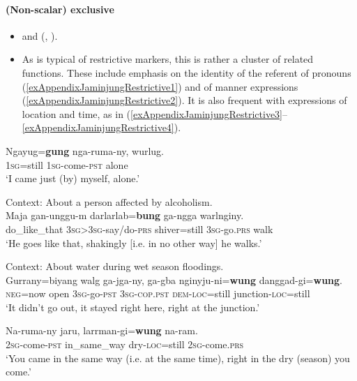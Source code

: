 \paragraph{(Non-scalar) exclusive}
\begin{itemize}
	\item \textcite[76–78]{Cleverly1968} and \citeauthor{SchultzeBerndt2000} (\citeyear[104]{SchultzeBerndt2000}, \citeyear{SchultzeBerndt2002}).
	\item As is typical of restrictive markers, this is rather a cluster of related functions. These include emphasis on the identity of the referent of pronouns (\ref{exAppendixJaminjungRestrictive1}) and of manner expressions (\ref{exAppendixJaminjungRestrictive2}). It is also frequent with expressions of location and time, as in (\ref{exAppendixJaminjungRestrictive3}–\ref{exAppendixJaminjungRestrictive4}).
\end{itemize}
\largerpage[2]
\begin{exe}
	\ex\label{exAppendixJaminjungRestrictive1}
	\gll Ngayug=\textbf{gung} nga-ruma-ny, wurlug.\\
	1\textsc{sg}=still 1\textsc{sg}-come-\textsc{pst} alone\\
	\glt \lq I came just (by) myself, alone.' \parencite[236]{SchultzeBerndt2002}
	
	\ex\label{exAppendixJaminjungRestrictive2}
	Context: About a person affected by alcoholism.\\
	\gll Maja gan-unggu-m darlarlab=\textbf{bung} ga-ngga warlnginy.\\
	do\_like\_that 3\textsc{sg}>3\textsc{sg}-say/do-\textsc{prs} shiver=still 3\textsc{sg}-go.\textsc{prs} walk\\
	\glt \lq He goes like that, shakingly [i.e. in no other way] he walks.' \parencite[235]{SchultzeBerndt2002}
	
	\ex\label{exAppendixJaminjungRestrictive3}
	Context: About water during wet season floodings.\\
	\gll Gurrany=biyang walg ga-jga-ny, ga-gba nginyju-ni=\textbf{wung} danggad-gi=\textbf{wung}.\\
	\textsc{neg}=now open 3\textsc{sg}-go-\textsc{pst} 3\textsc{sg}-\textsc{cop}.\textsc{pst} \textsc{dem}-\textsc{loc}=still junction-\textsc{loc}=still\\
	\glt \lq It didn’t go out, it stayed right here, right at the junction.' \parencite[238]{SchultzeBerndt2002}

	\ex\label{exAppendixJaminjungRestrictive4}
	\gll Na-ruma-ny jaru, larrman-gi=\textbf{wung} na-ram.\\
	2\textsc{sg}-come-\textsc{pst} in\_same\_way dry-\textsc{loc}=still 2\textsc{sg}-come.\textsc{prs}\\
	\glt \lq You came in the same way (i.e. at the same time), right in the dry (season) you come.' \parencite[238]{SchultzeBerndt2002}
\end{exe}

